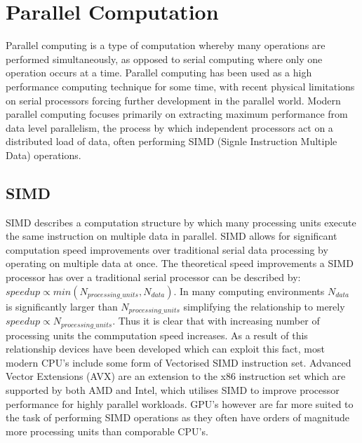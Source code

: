 
\section{Parallel Computation} %
Parallel computing is a type of computation whereby many operations are performed simultaneously, as
opposed to serial computing where only one operation occurs at a time\cite{wikiRef1}. Parallel
computing has been used as a high performance computing technique for some time, with recent
physical limitations on serial processors forcing further development in the parallel world.  Modern
parallel computing focuses primarily on extracting maximum performance from data level parallelism,
the process by which independent processors act on a distributed load of data, often performing SIMD
(Signle Instruction Multiple Data) operations. 

\subsection{SIMD}
SIMD describes a computation structure by which many processing units execute the same instruction
on multiple data in parallel. SIMD allows for significant computation speed improvements over
traditional serial data processing by operating on multiple data at once. The theoretical speed
improvements a SIMD processor has over a traditional serial processor can be described by: $ speedup
\propto min\left(N_{processing\_units}, N_{data}\right) $. In many computing environments $N_{data}$
is significantly larger than $N_{processing\_units}$ simplifying the relationship to merely $
speedup \propto N_{processing\_units}$. Thus it is clear that with increasing number of processing
units the commputation speed increases. As a result of this relationship devices have been developed
which can exploit this fact, most modern CPU's include some form of Vectorised SIMD instruction set.
Advanced Vector Extensions (AVX) are an extension to the x86 instruction set which are supported by
both AMD and Intel, which utilises SIMD to improve processor performance for highly parallel
workloads. GPU's however are far more suited to the task of performing SIMD operations as they often
have orders of magnitude more processing units than comporable CPU's.


